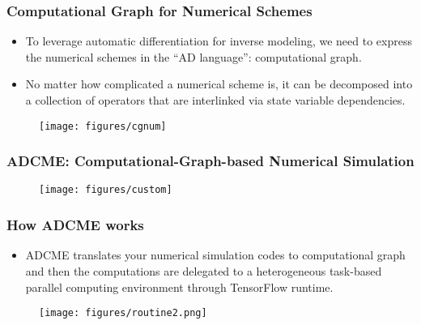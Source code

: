 \documentclass[usenames,dvipsnames]{beamer}
\begin{document}
\begin{frame}
	\frametitle{Computational Graph for Numerical Schemes}
	
	\begin{itemize}
		\item To leverage automatic differentiation for inverse modeling, we need to express the numerical schemes in the ``AD language'': computational graph. 
		\item No matter how complicated a numerical scheme is, it can be decomposed into a collection of operators that are interlinked via state variable dependencies. 
	\end{itemize}
	
	\begin{figure}[hbt]
		\texttt{[image: figures/cgnum]}
	\end{figure}
	
	
	
\end{frame}


\begin{frame}
	\frametitle{ADCME: Computational-Graph-based Numerical Simulation}
	
	\begin{figure}[hbt]
		\texttt{[image: figures/custom]}
	\end{figure}
\end{frame}

\begin{frame}
	\frametitle{How ADCME works}
	\begin{itemize}
		\item ADCME translates your numerical simulation codes to computational graph and then the computations are delegated to a heterogeneous task-based parallel computing environment through TensorFlow runtime. 
	\end{itemize}
	\begin{figure}[hbt]
		\texttt{[image: figures/routine2.png]}
	\end{figure}
\end{frame}
\end{document}
